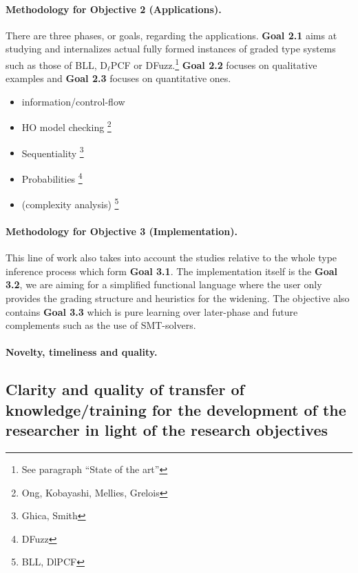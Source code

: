 \documentclass{article}[11pt]
\newcommand\BLL{BLL\xspace}
\newcommand\DlPCF{D$_\ell$PCF\xspace}
\newcommand\DFuzz{DFuzz\xspace}
\begin{document}


\paragraph{Methodology for Objective 2 (Applications).}

There are three phases, or goals, regarding the applications. {\bf Goal 2.1} aims at studying and internalizes actual fully formed instances of graded type systems such as those of \BLL, \DlPCF or \DFuzz.\footnote{See paragraph ``State of the art''} {\bf Goal 2.2} focuses on qualitative examples and {\bf Goal 2.3} focuses on quantitative ones.


\begin{itemize}
\item information/control-flow
\item HO model checking \footnote{Ong, Kobayashi, Mellies, Grelois}
\item Sequentiality \footnote{Ghica, Smith}
\item Probabilities \footnote{DFuzz}
\item (complexity analysis) \footnote{BLL, DlPCF}
\end{itemize}

\paragraph{Methodology for Objective 3 (Implementation).}

This line of work also takes into account the studies relative to the whole type inference process which form {\bf Goal 3.1}. The implementation itself is the {\bf Goal 3.2}, we are aiming for a simplified functional language where the user only provides the grading structure and heuristics for the widening. The objective also contains {\bf Goal 3.3} which is pure learning over later-phase and future complements such as the use of SMT-solvers.



\paragraph{Novelty, timeliness and quality.}

\subsection{Clarity and quality of transfer of knowledge/training for the development of the researcher in light of the research objectives}
\end{document}

